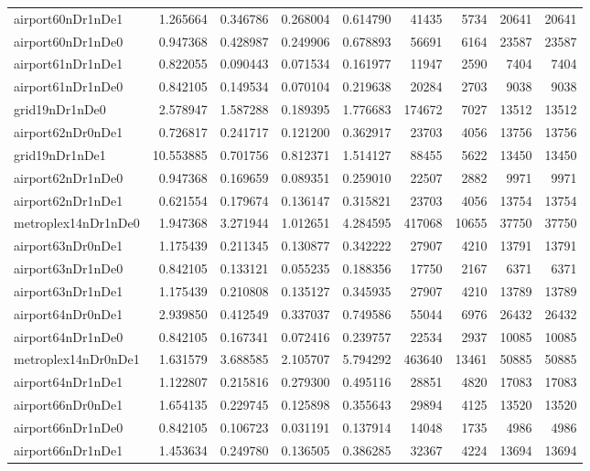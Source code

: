 \begin{longtable}{|l|r|r|r|r|r|r|r|r|}
airport60nDr1nDe1 & 1.265664 & 0.346786 & 0.268004 & 0.614790 & 41435 & 5734 & 20641 & 20641 \\
airport60nDr1nDe0 & 0.947368 & 0.428987 & 0.249906 & 0.678893 & 56691 & 6164 & 23587 & 23587 \\
airport61nDr1nDe1 & 0.822055 & 0.090443 & 0.071534 & 0.161977 & 11947 & 2590 & 7404 & 7404 \\
airport61nDr1nDe0 & 0.842105 & 0.149534 & 0.070104 & 0.219638 & 20284 & 2703 & 9038 & 9038 \\
grid19nDr1nDe0 & 2.578947 & 1.587288 & 0.189395 & 1.776683 & 174672 & 7027 & 13512 & 13512 \\
airport62nDr0nDe1 & 0.726817 & 0.241717 & 0.121200 & 0.362917 & 23703 & 4056 & 13756 & 13756 \\
grid19nDr1nDe1 & 10.553885 & 0.701756 & 0.812371 & 1.514127 & 88455 & 5622 & 13450 & 13450 \\
airport62nDr1nDe0 & 0.947368 & 0.169659 & 0.089351 & 0.259010 & 22507 & 2882 & 9971 & 9971 \\
airport62nDr1nDe1 & 0.621554 & 0.179674 & 0.136147 & 0.315821 & 23703 & 4056 & 13754 & 13754 \\
metroplex14nDr1nDe0 & 1.947368 & 3.271944 & 1.012651 & 4.284595 & 417068 & 10655 & 37750 & 37750 \\
airport63nDr0nDe1 & 1.175439 & 0.211345 & 0.130877 & 0.342222 & 27907 & 4210 & 13791 & 13791 \\
airport63nDr1nDe0 & 0.842105 & 0.133121 & 0.055235 & 0.188356 & 17750 & 2167 & 6371 & 6371 \\
airport63nDr1nDe1 & 1.175439 & 0.210808 & 0.135127 & 0.345935 & 27907 & 4210 & 13789 & 13789 \\
airport64nDr0nDe1 & 2.939850 & 0.412549 & 0.337037 & 0.749586 & 55044 & 6976 & 26432 & 26432 \\
airport64nDr1nDe0 & 0.842105 & 0.167341 & 0.072416 & 0.239757 & 22534 & 2937 & 10085 & 10085 \\
metroplex14nDr0nDe1 & 1.631579 & 3.688585 & 2.105707 & 5.794292 & 463640 & 13461 & 50885 & 50885 \\
airport64nDr1nDe1 & 1.122807 & 0.215816 & 0.279300 & 0.495116 & 28851 & 4820 & 17083 & 17083 \\
airport66nDr0nDe1 & 1.654135 & 0.229745 & 0.125898 & 0.355643 & 29894 & 4125 & 13520 & 13520 \\
airport66nDr1nDe0 & 0.842105 & 0.106723 & 0.031191 & 0.137914 & 14048 & 1735 & 4986 & 4986 \\
airport66nDr1nDe1 & 1.453634 & 0.249780 & 0.136505 & 0.386285 & 32367 & 4224 & 13694 & 13694 \\

\end{longtable}
